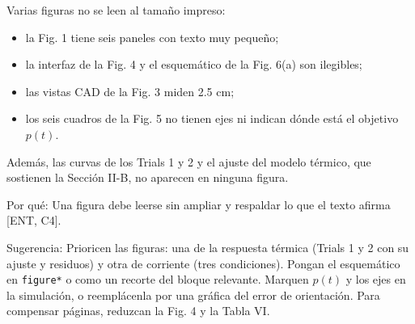 \documentclass{LabDSTresponse}
\begin{document}
{Varias figuras no se leen al tamaño impreso:
\begin{itemize}
    \item la Fig. 1 tiene seis paneles con texto muy pequeño;
    \item la interfaz de la Fig. 4 y el esquemático de la Fig. 6(a) son ilegibles;
    \item las vistas CAD de la Fig. 3 miden 2.5 cm;
    \item los seis cuadros de la Fig. 5 no tienen ejes ni indican dónde está el objetivo $p(t)$.
\end{itemize}
Además, las curvas de los Trials 1 y 2 y el ajuste del modelo térmico, que sostienen la Sección II-B, no aparecen en ninguna figura.

Por qué: Una figura debe leerse sin ampliar y respaldar lo que el texto afirma [ENT, C4].

Sugerencia: Prioricen las figuras: una de la respuesta térmica (Trials 1 y 2 con su ajuste y residuos) y otra de corriente (tres condiciones). Pongan el esquemático en \texttt{figure*} o como un recorte del bloque relevante. Marquen $p(t)$ y los ejes en la simulación, o reemplácenla por una gráfica del error de orientación. Para compensar páginas, reduzcan la Fig. 4 y la Tabla VI.}
\end{document}
